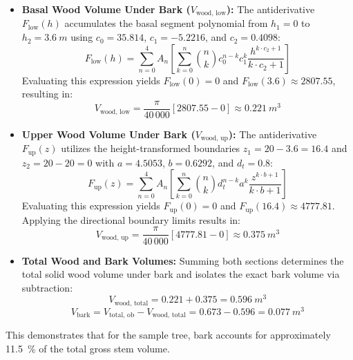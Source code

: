 \documentclass[twocolumn, bibliography=totoc]{scrartcl}
\begin{document}
\begin{itemize}
  \item \textbf{Basal Wood Volume Under Bark ($V_{\text{wood, low}}$):}
  The antiderivative $F_{\text{low}}(h)$ accumulates the basal segment polynomial from $h_1 = 0$ to $h_2 = \qty{3.6}{m}$ using $c_0 = 35.814$, $c_1 = -5.2216$, and $c_2 = 0.4098$:
  \begin{equation}
      F_{\text{low}}(h) = \sum_{n=0}^{4} A_n \left[ \sum_{k=0}^{n} \binom{n}{k} c_0^{n-k} c_1^k \frac{h^{k \cdot c_2 + 1}}{k \cdot c_2 + 1} \right]
  \end{equation}
  Evaluating this expression yields $F_{\text{low}}(0) = 0$ and $F_{\text{low}}(3.6) \approx 2807.55$, resulting in:
  \begin{equation}
      V_{\text{wood, low}} = \frac{\pi}{40\,000} \left[ 2807.55 - 0 \right] \approx \qty{0.221}{m^3}
  \end{equation}

  \item \textbf{Upper Wood Volume Under Bark ($V_{\text{wood, up}}$):}
  The antiderivative $F_{\text{up}}(z)$ utilizes the height-transformed boundaries $z_1 = 20 - 3.6 = 16.4$ and $z_2 = 20 - 20 = 0$ with $a = 4.5053$, $b = 0.6292$, and $d_t = 0.8$:
  \begin{equation}
      F_{\text{up}}(z) = \sum_{n=0}^{4} A_n \left[ \sum_{k=0}^{n} \binom{n}{k} d_t^{n-k} a^k \frac{z^{k \cdot b + 1}}{k \cdot b + 1} \right]
  \end{equation}
  Evaluating this expression yields $F_{\text{up}}(0) = 0$ and $F_{\text{up}}(16.4) \approx 4777.81$. Applying the directional boundary limits results in:
  \begin{equation}
      V_{\text{wood, up}} = \frac{\pi}{40\,000} \left[ 4777.81 - 0 \right] \approx \qty{0.375}{m^3}
  \end{equation}

  \item \textbf{Total Wood and Bark Volumes:}
  Summing both sections determines the total solid wood volume under bark and isolates the exact bark volume via subtraction:
  \begin{equation}
      V_{\text{wood, total}} = 0.221 + 0.375 = \qty{0.596}{m^3}
  \end{equation}
  \begin{equation}
      V_{\text{bark}} = V_{\text{total, ob}} - V_{\text{wood, total}} = 0.673 - 0.596 = \qty{0.077}{m^3}
  \end{equation}
\end{itemize}
This demonstrates that for the sample tree, bark accounts for approximately \qty{11.5}{\%} of the total gross stem volume.
\end{document}
